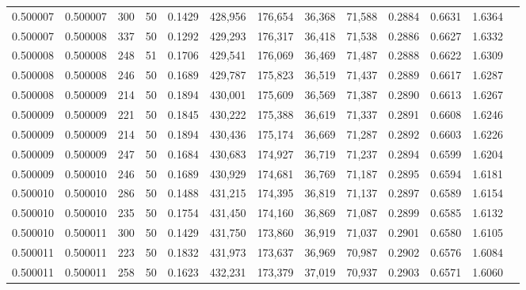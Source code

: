 \begin{tabular}{rrrrrrrrrrrrr}
0.500007 & 0.500007 &   300 &  50 &                                     0.1429 & 428,956 & 176,654 &  36,368 &  71,588 & 0.2884 & 0.6631 & 1.6364 \\
0.500007 & 0.500008 &   337 &  50 &                                     0.1292 & 429,293 & 176,317 &  36,418 &  71,538 & 0.2886 & 0.6627 & 1.6332 \\
0.500008 & 0.500008 &   248 &  51 &                                     0.1706 & 429,541 & 176,069 &  36,469 &  71,487 & 0.2888 & 0.6622 & 1.6309 \\
0.500008 & 0.500008 &   246 &  50 &                                     0.1689 & 429,787 & 175,823 &  36,519 &  71,437 & 0.2889 & 0.6617 & 1.6287 \\
0.500008 & 0.500009 &   214 &  50 &                                     0.1894 & 430,001 & 175,609 &  36,569 &  71,387 & 0.2890 & 0.6613 & 1.6267 \\
0.500009 & 0.500009 &   221 &  50 &                                     0.1845 & 430,222 & 175,388 &  36,619 &  71,337 & 0.2891 & 0.6608 & 1.6246 \\
0.500009 & 0.500009 &   214 &  50 &                                     0.1894 & 430,436 & 175,174 &  36,669 &  71,287 & 0.2892 & 0.6603 & 1.6226 \\
0.500009 & 0.500009 &   247 &  50 &                                     0.1684 & 430,683 & 174,927 &  36,719 &  71,237 & 0.2894 & 0.6599 & 1.6204 \\
0.500009 & 0.500010 &   246 &  50 &                                     0.1689 & 430,929 & 174,681 &  36,769 &  71,187 & 0.2895 & 0.6594 & 1.6181 \\
0.500010 & 0.500010 &   286 &  50 &                                     0.1488 & 431,215 & 174,395 &  36,819 &  71,137 & 0.2897 & 0.6589 & 1.6154 \\
0.500010 & 0.500010 &   235 &  50 &                                     0.1754 & 431,450 & 174,160 &  36,869 &  71,087 & 0.2899 & 0.6585 & 1.6132 \\
0.500010 & 0.500011 &   300 &  50 &                                     0.1429 & 431,750 & 173,860 &  36,919 &  71,037 & 0.2901 & 0.6580 & 1.6105 \\
0.500011 & 0.500011 &   223 &  50 &                                     0.1832 & 431,973 & 173,637 &  36,969 &  70,987 & 0.2902 & 0.6576 & 1.6084 \\
0.500011 & 0.500011 &   258 &  50 &                                     0.1623 & 432,231 & 173,379 &  37,019 &  70,937 & 0.2903 & 0.6571 & 1.6060 \\

\end{tabular}
